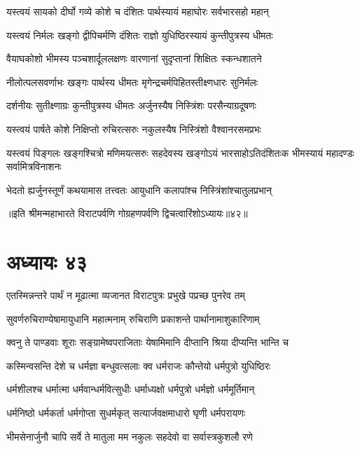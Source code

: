 \twolineshloka
{यस्त्वयं सायको दीर्घो गव्ये कोशे च दंशितः}
{पार्थस्यायं महाघोरः सर्वभारसहो महान्}


\twolineshloka
{यस्त्वयं निर्मलः खङ्गो द्वीपिचर्मणि दंशितः}
{राज्ञो युधिष्ठिरस्यायं कुन्तीपुत्रस्य धीमतः}



\twolineshloka
{वैयाघकोशो भीमस्य पञ्चशार्दूललक्षणः}
{वारणानां सुदृप्तानां शिक्षितः स्कन्धशातने}


\twolineshloka
{नीलोत्पलसवर्णाभः खङ्गः पार्थस्य धीमतः}
{मृगेन्द्रचर्मपिहितस्तीक्ष्णधारः सुनिर्मलः}


\twolineshloka
{दर्शनीयः सुतीक्ष्णाग्रः कुन्तीपुत्रस्य धीमतः}
{अर्जुनस्यैष निस्त्रिंशः परसैन्याग्रदूषणः}


\twolineshloka
{यस्त्वयं पार्षते कोशे निक्षिप्तो रुचिरत्सरुः}
{नकुलस्यैष निस्त्रिंशो वैश्वानरसमप्रभः}


\threelineshloka
{यस्त्वयं पिङ्गलः खङ्गश्चित्रो मणिमयत्सरुः}
{सहदेवस्य खङ्गोऽयं भारसाहोऽतिदंशितःक}
{भीमस्यायं महादण्डः सर्वामित्रविनाशनः}



\twolineshloka
{भेदतो ह्यर्जुनस्तूर्णं कथयामास तत्त्वतः}
{आयुधानि कलापांश्च निस्त्रिंशांश्चातुलप्रभान्}

॥इति श्रीमन्महाभारते विराटपर्वणि गोग्रहणपर्वणि द्विचत्वारिंशोऽध्यायः॥४२॥

\chapter{अध्यायः ४३}

\twolineshloka
{एतस्मिन्नन्तरे पार्थं न मूढात्मा व्यजानत}
{विराटपुत्रः प्रभुखे पप्रच्छ पुनरेव तम्}


\twolineshloka
{सुवर्णरुचिराण्येषामायुधानि महात्मनाम्}
{रुचिराणि प्रकाशन्ते पार्थानामाशुकारिणाम्}


\twolineshloka
{क्वनु ते पाण्डवाः शूराः सङ्ग्रामेष्वपराजिताः}
{येषामिमानि दीप्तानि श्रिया दीप्यन्ति भान्ति च}



\twolineshloka
{कस्मिन्वसन्ति देशे च धर्मज्ञा बन्धुवत्सलाः}
{क्व धर्मराजः कौन्तेयो धर्मपुत्रो युधिष्ठिरः}


\twolineshloka
{धर्मशीलश्च धर्मात्मा धर्मवान्धर्मवित्सुधीः}
{धर्माध्यक्षो धर्मपुत्रो धर्मज्ञो धर्ममूर्तिमान्}


\twolineshloka
{धर्मनिष्ठो धर्मकर्ता धर्मगोप्ता सुधर्मकृत्}
{सत्यार्जवक्षमाधारो घृणी धर्मपरायणः}


\twolineshloka
{भीमसेनार्जुनौ चापि सर्वे ते मातुला मम}
{नकुलः सहदेवो वा सर्वास्त्रकुशलौ रणे}


